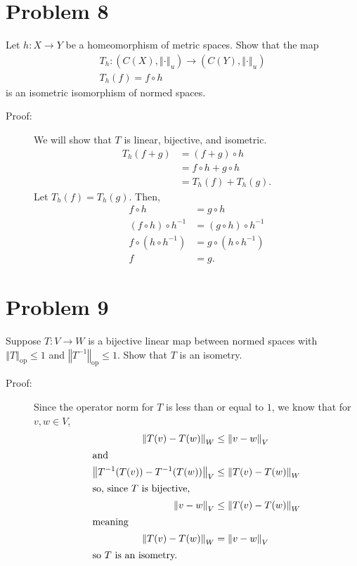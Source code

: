 \documentclass[8pt]{extarticle}
\newcommand{\norm}[1]{\left\Vert #1\right\Vert}
\begin{document}
  \section{Problem 8}%
  Let $h: X\rightarrow Y$ be a homeomorphism of metric spaces. Show that the map
  \begin{align*}
    T_h: (C(X),\norm{\cdot}_u) \rightarrow (C(Y),\norm{\cdot}_u)\\
    T_h(f) = f\circ h
  \end{align*}
  is an isometric isomorphism of normed spaces.
  \begin{description}
    \item[Proof:] We will show that $T$ is linear, bijective, and isometric. 
      \begin{align*}
        T_{h}(f + g) &= (f+g)\circ h\\
                     &= f\circ h + g\circ h \\
                     &= T_h(f) + T_h(g).
      \end{align*}
      Let $T_h(f) = T_h(g)$. Then,
      \begin{align*}
        f\circ h &= g\circ h\\
        (f\circ h)\circ h^{-1} &= (g\circ h)\circ h^{-1}\\
        f\circ (h\circ h^{-1}) &= g\circ (h\circ h^{-1})\\
        f &= g.
      \end{align*}
  \end{description}
  
  \section{Problem 9}%
  Suppose $T: V\rightarrow W$ is a bijective linear map between normed spaces with $\norm{T}_{\text{op}} \leq 1$ and $\norm{T^{-1}}_{\text{op}}\leq 1$. Show that $T$ is an isometry.
  \begin{description}
    \item[Proof:] Since the operator norm for $T$ is less than or equal to $1$, we know that for $v,w\in V$,
      \begin{align*}
        \norm{T(v)-T(w)}_{W} &\leq \norm{v-w}_{V}\\
        \intertext{and}
        \norm{T^{-1}(T(v)) - T^{-1}(T(w))}_{V} &\leq \norm{T(v)-T(w)}_{W}\\
        \intertext{so, since $T$ is bijective,}
        \norm{v-w}_{V} &\leq \norm{T(v)-T(w)}_{W}\\
        \intertext{meaning}
        \norm{T(v)-T(w)}_{W} &= \norm{v-w}_{V}\\
        \intertext{so $T$ is an isometry.}
      \end{align*}
  \end{description}
\end{document}
